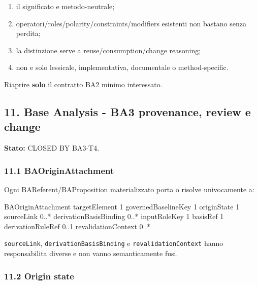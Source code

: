 \documentclass[
  9pt,
  a4paper,
]{article}
\newenvironment{Shaded}{}{}
\newcommand{\NormalTok}[1]{#1}
\providecommand{\tightlist}{%
  \setlength{\itemsep}{0pt}\setlength{\parskip}{0pt}}
\begin{document}
\begin{enumerate}
\def\labelenumi{\arabic{enumi}.}
\tightlist
\item
  il significato e metodo-neutrale;
\item
  operatori/roles/polarity/constraints/modifiers esistenti non bastano
  senza perdita;
\item
  la distinzione serve a reuse/consumption/change reasoning;
\item
  non e solo lessicale, implementativa, documentale o method-specific.
\end{enumerate}

Riaprire \textbf{solo} il contratto BA2 minimo interessato.

\subsection{11. Base Analysis - BA3 provenance, review e
change}\label{base-analysis---ba3-provenance-review-e-change}

\textbf{Stato:} CLOSED BY BA3-T4.

\subsubsection{11.1 BAOriginAttachment}\label{baoriginattachment}

Ogni BAReferent/BAProposition materializzato porta o risolve
univocamente a:

\begin{Shaded}
\begin{Highlighting}[]
\NormalTok{BAOriginAttachment}
\NormalTok{  targetElement             1}
\NormalTok{  governedBaselineKey       1}
\NormalTok{  originState               1}
\NormalTok{  sourceLink                0..*}
\NormalTok{  derivationBasisBinding    0..*}
\NormalTok{    inputRoleKey            1}
\NormalTok{    basisRef                1}
\NormalTok{  derivationRuleRef         0..1}
\NormalTok{  revalidationContext       0..*}
\end{Highlighting}
\end{Shaded}

\texttt{sourceLink}, \texttt{derivationBasisBinding} e
\texttt{revalidationContext} hanno responsabilita diverse e non vanno
semanticamente fusi.

\subsubsection{11.2 Origin state}\label{origin-state}
\end{document}
